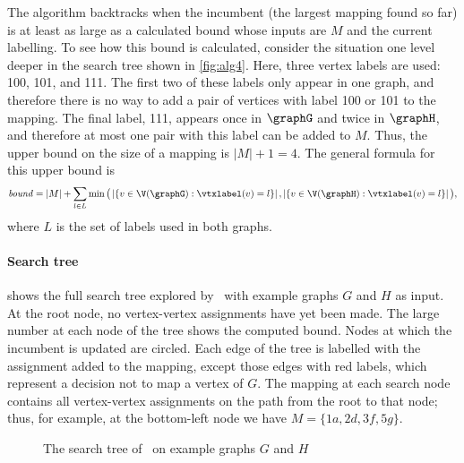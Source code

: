 The algorithm backtracks when the incumbent (the largest mapping found so far) is at least as large
as a calculated bound whose inputs are $M$ and the current labelling. To see how
this bound is calculated, consider the situation one level deeper in the
search tree shown in \cref{fig:alg4}.  
Here, three vertex labels are used: 100,
101, and 111.  The first two of these labels only appear in one graph, and therefore
there is no way to add a pair of vertices with label 100 or 101 to the mapping.
The final label, 111, appears once in $\graphG$ and twice in $\graphH$, and therefore at
most one pair with this label can be added to $M$.  Thus, the upper bound on
the size of a mapping is $|M| + 1 = 4$. The general formula for this upper bound is
\begin{multline*}
    \mathit{bound} = \left|M\right| + \sum_{l \in L} \min\big(\left|\{ v \in \V(\graphG) : \vtxlabel(v)=l\}\right|,
        \left|\{ v \in \V(\graphH) : \vtxlabel(v)=l \}\right|\big) \text{,}
\end{multline*} where $L$ is the set of labels used in both graphs.


\paragraph{Search tree}  shows the full search
tree explored by \McSplit\ with example graphs $G$ and $H$ as input.
At the root node, no vertex-vertex assignments have yet been made.  The large
number at each node of the tree shows the computed bound.
Nodes at which the incumbent is updated are circled.
Each edge of the tree is labelled with the assignment added to the mapping, except those edges
with red labels, which represent a decision not to map a vertex of $G$.
The mapping at each search node contains all vertex-vertex assignments on the path
from the root to that node; thus, for example, at the bottom-left node
we have $M=\{1a,2d,3f,5g\}$.

\begin{figure}[htb]
    \centering
    
    \caption{The search tree of \McSplit\ on example graphs $G$ and $H$}
    \label{figure:mcsplit-search-tree}
\end{figure}


